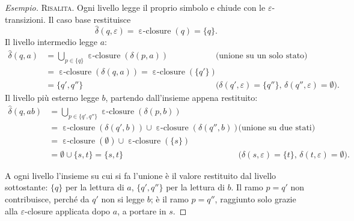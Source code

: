 \documentclass[a4paper, 11pt, oneside]{book}
\theoremstyle{formale}
\DeclareMathOperator{\eclosure}{\varepsilon\text{-}closure}
\newenvironment{esempio}
    {\begin{proof}[\textit{Esempio}]\renewcommand{\qedsymbol}{$\diamond$}}
    {\end{proof}}
\begin{document}
\begin{esempio}
        \textsc{Risalita}. Ogni livello legge il proprio simbolo e chiude con le
        $\varepsilon$-transizioni. Il caso base restituisce
        \begin{equation*}
            \hat{\delta}(q, \varepsilon) = \eclosure(q) = \{q\}.
        \end{equation*}
        Il livello intermedio legge $a$:
        \begin{align*}
            \hat{\delta}(q, a)
                &= \bigcup_{p \in \{q\}} \eclosure(\delta(p, a))
                    && \text{(unione su un solo stato)} \\
                &= \eclosure(\delta(q, a)) = \eclosure(\{q'\}) \\
                &= \{q', q''\}
                    && \text{($\delta(q', \varepsilon) = \{q''\}$, $\delta(q'',
                    \varepsilon) = \emptyset$)}.
        \end{align*}
        Il livello pi\`u esterno legge $b$, partendo dall'insieme appena restituito:
        \begin{align*}
            \hat{\delta}(q, ab)
                &= \bigcup_{p \in \{q', q''\}} \eclosure(\delta(p, b)) \\
                &= \eclosure(\delta(q', b)) \cup \eclosure(\delta(q'', b))
                    && \text{(unione su due stati)} \\
                &= \eclosure(\emptyset) \cup \eclosure(\{s\}) \\
                &= \emptyset \cup \{s, t\} = \{s, t\}
                    && \text{($\delta(s, \varepsilon) = \{t\}$, $\delta(t,
                    \varepsilon) = \emptyset$)}.
        \end{align*}

        A ogni livello l'insieme su cui si fa l'unione \`e il valore restituito dal livello
        sottostante: $\{q\}$ per la lettura di $a$, $\{q', q''\}$ per la lettura di $b$.
        Il ramo $p = q'$ non contribuisce, perch\'e da $q'$ non si legge $b$; \`e il ramo
        $p = q''$, raggiunto solo grazie alla $\varepsilon$-closure applicata dopo $a$, a
        portare in $s$.
    \end{esempio}
\end{document}
